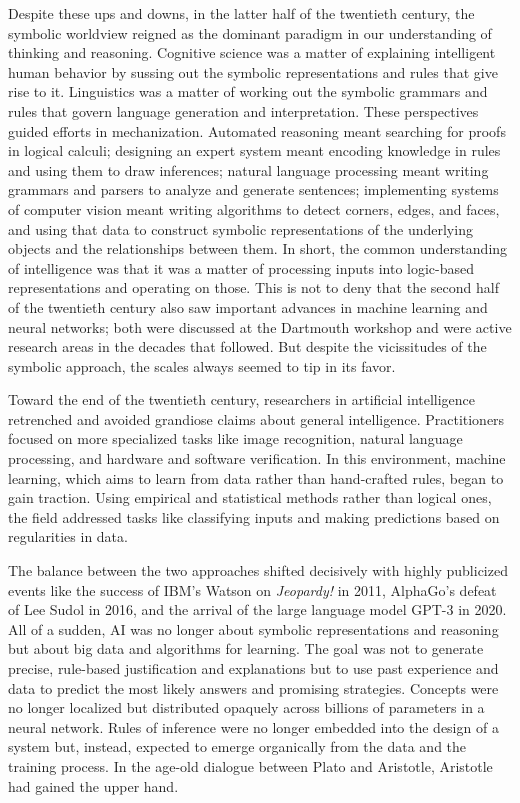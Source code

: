\documentclass[11pt]{article}
\begin{document}
Despite these ups and downs, in the latter half of the twentieth century, the symbolic worldview reigned as the dominant paradigm in our understanding of thinking and reasoning. Cognitive science was a matter of explaining intelligent human behavior by sussing out the symbolic representations and rules that give rise to it. Linguistics was a matter of working out the symbolic grammars and rules that govern language generation and interpretation. These perspectives guided efforts in mechanization. Automated reasoning meant searching for proofs in logical calculi; designing an expert system meant encoding knowledge in rules and using them to draw inferences; natural language processing meant writing grammars and parsers to analyze and generate sentences; implementing systems of computer vision meant writing algorithms to detect corners, edges, and faces, and using that data to construct symbolic representations of the underlying objects and the relationships between them. In short, the common understanding of intelligence was that it was a matter of processing inputs into logic-based representations and operating on those. This is not to deny that the second half of the twentieth century also saw important advances in machine learning and neural networks; both were discussed at the Dartmouth workshop and were active research areas in the decades that followed. But despite the vicissitudes of the symbolic approach, the scales always seemed to tip in its favor.

Toward the end of the twentieth century, researchers in artificial intelligence retrenched and avoided grandiose claims about general intelligence. Practitioners focused on more specialized tasks like image recognition, natural language processing, and hardware and software verification. In this environment, machine learning, which aims to learn from data rather than hand-crafted rules, began to gain traction. Using empirical and statistical methods rather than logical ones, the field addressed tasks like classifying inputs and making predictions based on regularities in data.

The balance between the two approaches shifted decisively with highly publicized events like the success of IBM's Watson on \emph{Jeopardy!} in 2011, AlphaGo's defeat of Lee Sudol in 2016, and the arrival of the large language model GPT-3 in 2020. All of a sudden, AI was no longer about symbolic representations and reasoning but about big data and algorithms for learning. The goal was not to generate precise, rule-based justification and explanations but to use past experience and data to predict the most likely answers and promising strategies. Concepts were no longer localized but distributed opaquely across billions of parameters in a neural network. Rules of inference were no longer embedded into the design of a system but, instead, expected to emerge organically from the data and the training process. In the age-old dialogue between Plato and Aristotle, Aristotle had gained the upper hand.
\end{document}
